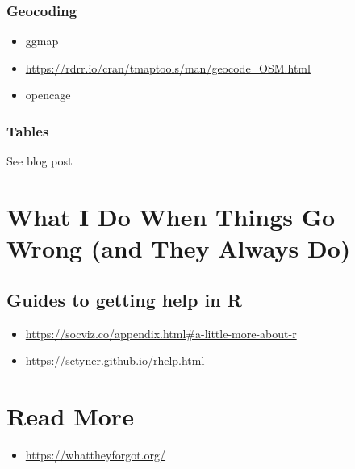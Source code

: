 \documentclass[]{book}
\providecommand{\tightlist}{%
  \setlength{\itemsep}{0pt}\setlength{\parskip}{0pt}}
\begin{document}
\hypertarget{geocoding}{%
\subsection{Geocoding}\label{geocoding}}

\begin{itemize}
\tightlist
\item
  ggmap
\item
  \url{https://rdrr.io/cran/tmaptools/man/geocode_OSM.html}
\item
  opencage
\end{itemize}

\hypertarget{tables-1}{%
\subsection{Tables}\label{tables-1}}

See blog post

\hypertarget{what-i-do-when-things-go-wrong-and-they-always-do}{%
\chapter{What I Do When Things Go Wrong (and They Always Do)}\label{what-i-do-when-things-go-wrong-and-they-always-do}}

\hypertarget{guides-to-getting-help-in-r}{%
\section{Guides to getting help in R}\label{guides-to-getting-help-in-r}}

\begin{itemize}
\tightlist
\item
  \url{https://socviz.co/appendix.html\#a-little-more-about-r}
\item
  \url{https://sctyner.github.io/rhelp.html}
\end{itemize}

\hypertarget{read-more}{%
\chapter{Read More}\label{read-more}}

\begin{itemize}
\tightlist
\item
  \url{https://whattheyforgot.org/}
\end{itemize}


\end{document}
